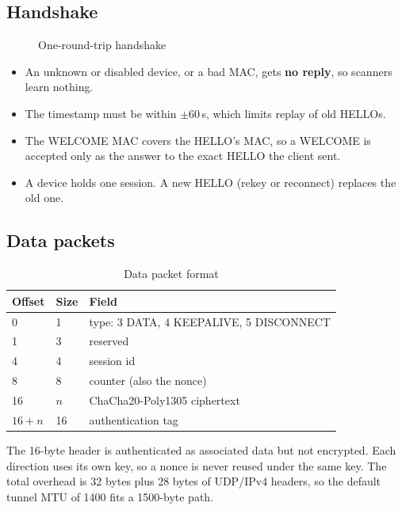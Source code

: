 \documentclass[12pt,a4paper]{report}
\begin{document}
\subsection{Handshake}

\begin{figure}[H]
\centering
{}
\caption{One-round-trip handshake}
\label{fig:handshake}
\end{figure}

\begin{itemize}
  \item An unknown or disabled device, or a bad MAC, gets \textbf{no reply}, so scanners learn nothing.
  \item The timestamp must be within $\pm60$\,s, which limits replay of old HELLOs.
  \item The WELCOME MAC covers the HELLO's MAC, so a WELCOME is accepted only as the answer
        to the exact HELLO the client sent.
  \item A device holds one session. A new HELLO (rekey or reconnect) replaces the old one.
\end{itemize}

\subsection{Data packets}
\begin{table}[H]
\centering
\caption{Data packet format}
\begin{tabular}{@{}lll@{}}
\toprule
\textbf{Offset} & \textbf{Size} & \textbf{Field}\\
\midrule
0 & 1 & type: 3 DATA, 4 KEEPALIVE, 5 DISCONNECT\\
1 & 3 & reserved\\
4 & 4 & session id\\
8 & 8 & counter (also the nonce)\\
16 & $n$ & ChaCha20-Poly1305 ciphertext\\
$16+n$ & 16 & authentication tag\\
\bottomrule
\end{tabular}
\end{table}
The 16-byte header is authenticated as associated data but not encrypted. Each
direction uses its own key, so a nonce is never reused under the same key. The total
overhead is 32 bytes plus 28 bytes of UDP/IPv4 headers, so the default tunnel MTU of
1400 fits a 1500-byte path.
\end{document}
